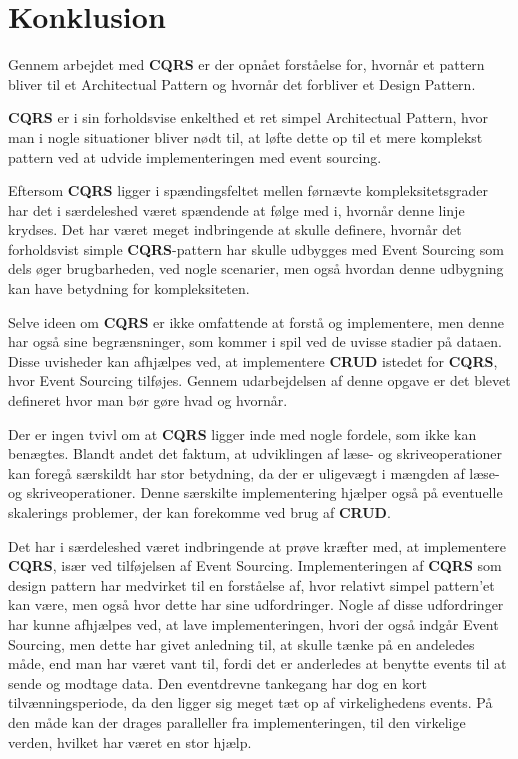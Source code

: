 \chapter{Konklusion}
Gennem arbejdet med \textbf{CQRS} er der opnået forståelse for, hvornår et pattern bliver til et Architectual Pattern og hvornår det forbliver et Design Pattern.

\textbf{CQRS} er i sin forholdsvise enkelthed et ret simpel Architectual Pattern, hvor man i nogle situationer bliver nødt til, at løfte dette op til et mere komplekst pattern ved at udvide implementeringen med event sourcing.\newline

Eftersom \textbf{CQRS} ligger i spændingsfeltet mellen førnævte kompleksitetsgrader har det i særdeleshed været spændende at følge med i, hvornår denne linje krydses. Det har været meget indbringende at skulle definere, hvornår det forholdsvist simple \textbf{CQRS}-pattern har skulle udbygges med Event Sourcing som dels øger brugbarheden, ved nogle scenarier, men også hvordan denne udbygning kan have betydning for kompleksiteten.\newline

Selve ideen om \textbf{CQRS} er ikke omfattende at forstå og implementere, men denne har også sine begrænsninger, som kommer i spil ved de uvisse stadier på dataen. Disse uvisheder kan afhjælpes ved, at implementere \textbf{CRUD} istedet for \textbf{CQRS}, hvor Event Sourcing tilføjes. Gennem udarbejdelsen af denne opgave er det blevet defineret hvor man bør gøre hvad og hvornår. \newline

Der er ingen tvivl om at \textbf{CQRS} ligger inde med nogle fordele, som ikke kan benægtes. Blandt andet det faktum, at udviklingen af læse- og skriveoperationer kan foregå særskildt har stor betydning, da der er uligevægt i mængden af læse- og skriveoperationer. Denne særskilte implementering hjælper også på eventuelle skalerings problemer, der kan forekomme ved brug af \textbf{CRUD}.\newline 

Det har i særdeleshed været indbringende at prøve kræfter med, at implementere \textbf{CQRS}, især ved tilføjelsen af Event Sourcing. Implementeringen af \textbf{CQRS} som design pattern har medvirket til en forståelse af, hvor relativt simpel pattern'et kan være, men også hvor dette har sine udfordringer. Nogle af disse udfordringer har kunne afhjælpes ved, at lave implementeringen, hvori der også indgår Event Sourcing, men dette har givet anledning til, at skulle tænke på en andeledes måde, end man har været vant til, fordi det er anderledes at benytte events til at sende og modtage data. 
Den eventdrevne tankegang har dog en kort tilvænningsperiode, da den ligger sig meget tæt op af virkelighedens events. På den måde kan der drages paralleller fra implementeringen, til den virkelige verden, hvilket har været en stor hjælp. 
